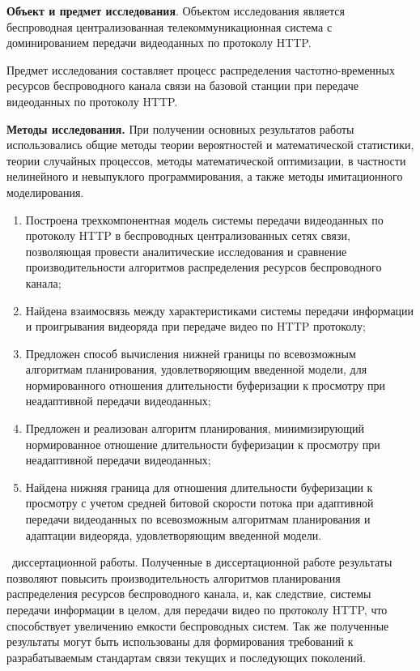 \textbf{Объект и предмет исследования}. Объектом исследования является беспроводная централизованная телекоммуникационная система с доминированием передачи видеоданных по протоколу HTTP.

Предмет исследования составляет процесс распределения частотно-временных ресурсов беспроводного канала связи на базовой станции при передаче видеоданных по протоколу HTTP.

\textbf{Методы исследования.} При получении основных результатов работы использовались общие методы теории вероятностей и математической статистики, теории случайных процессов, методы математической оптимизации, в частности нелинейного и невыпуклого программирования, а также методы имитационного моделирования.

\novelty
\begin{enumerate}
    \item Построена трехкомпонентная модель системы передачи видеоданных по протоколу HTTP в беспроводных централизованных сетях связи, позволяющая провести аналитические исследования и сравнение производительности алгоритмов распределения ресурсов беспроводного канала;
    \item Найдена взаимосвязь между характеристиками системы передачи информации и проигрывания видеоряда при передаче видео по HTTP протоколу;
    \item Предложен способ вычисления нижней границы по всевозможным алгоритмам планирования, удовлетворяющим введенной модели, для нормированного отношения длительности буферизации к просмотру при неадаптивной передачи видеоданных;
    \item Предложен и реализован алгоритм планирования, минимизирующий нормированное отношение длительности буферизации к просмотру при неадаптивной передачи видеоданных;
    \item Найдена нижняя граница для отношения длительности буферизации к просмотру с учетом средней битовой скорости потока при адаптивной передачи видеоданных по всевозможным алгоритмам планирования и адаптации видеоряда, удовлетворяющим введенной модели.
\end{enumerate}

\influence\ диссертационной работы. Полученные в диссертационной работе результаты позволяют повысить производительность алгоритмов планирования распределения ресурсов беспроводного канала, и, как следствие, системы передачи информации в целом, для передачи видео по протоколу HTTP, что способствует увеличению емкости беспроводных систем. Так же полученные результаты могут быть использованы для формирования требований к разрабатываемым стандартам связи текущих и последующих поколений.

